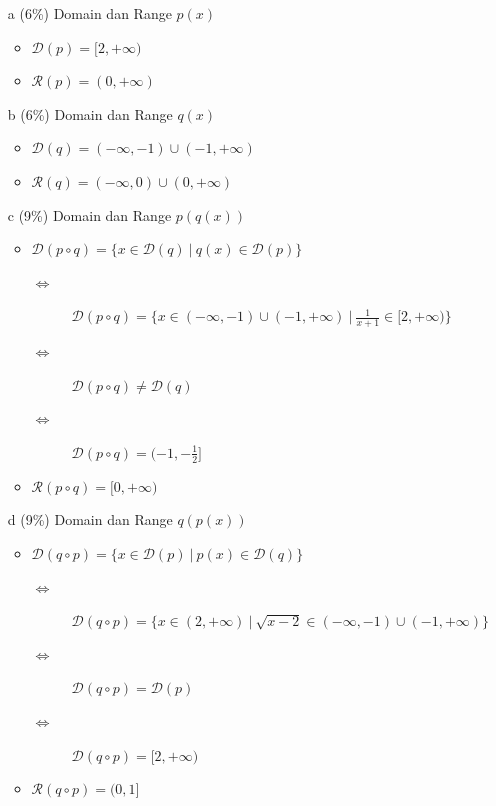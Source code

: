 \documentclass[12pt, a4paper]{article}
\begin{document}
    \begin{enumerate}
        \item[a] (6\%) Domain dan Range $p(x)$
        \item[]\begin{itemize}
            \item $\mathcal{D}(p)=[2,+\infty)$
            \item $\mathcal{R}(p)=(0,+\infty)$
        \end{itemize}
        \vspace{1cm}
        \item[b] (6\%) Domain dan Range $q(x)$
        \item[]\begin{itemize}
            \item $\mathcal{D}(q)=(-\infty,-1)\cup(-1,+\infty)$
            \item $\mathcal{R}(q)=(-\infty,0)\cup(0,+\infty)$
        \end{itemize}
        \vspace{1cm}
        \item[c] (9\%) Domain dan Range $p(q(x))$
        \item[] \begin{itemize}
            \item $\mathcal{D}(p\circ q)=\{x\in\mathcal{D}(q)\ |\ q(x) \in \mathcal{D}(p)\}$ 
            \begin{description}
                \item[$\Leftrightarrow$] $\mathcal{D}(p\circ q)=\{x\in(-\infty,-1)\cup(-1,+\infty)\ |\ \frac{1}{x + 1}\in[2,+\infty)\}$ 
                \item[$\Leftrightarrow$] $\mathcal{D}(p\circ q)\neq\mathcal{D}(q)$ 
                \item[$\Leftrightarrow$] $\mathcal{D}(p\circ q)= (-1,-\frac{1}{2}]$ 
            \end{description}
            \item $\mathcal{R}(p\circ q)=[0,+\infty)$
        \end{itemize}
        \vspace{1cm}
        \item[d] (9\%) Domain dan Range $q(p(x))$
        \item[] \begin{itemize}
            \item $\mathcal{D}(q\circ p)=\{x\in\mathcal{D}(p)\ |\ p(x) \in \mathcal{D}(q)\}$
            \begin{description}
                \item[$\Leftrightarrow$] $\mathcal{D}(q\circ p)=\{x\in(2,+\infty)\ |\ \sqrt{x - 2}\in(-\infty,-1)\cup(-1,+\infty)\}$ 
                \item[$\Leftrightarrow$] $\mathcal{D}(q\circ p)=\mathcal{D}(p)$ 
                \item[$\Leftrightarrow$] $\mathcal{D}(q\circ p)=[2,+\infty)$
            \end{description}
            \item $\mathcal{R}(q\circ p)=(0,1]$
        \end{itemize}
    \end{enumerate}
    \pagebreak
\end{document}
